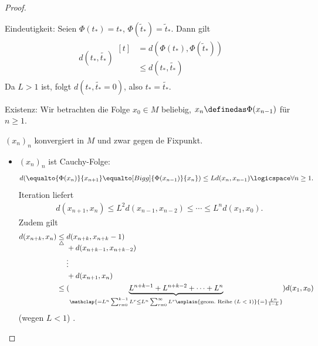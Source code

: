 \begin{proof}
    \begin{proofdescription}
        \item[Eindeutigkeit:] Seien \( \Phi(t_*)=t_*\), \( \Phi(\tilde{t}_*)=\tilde{t}_* \). Dann gilt
        \begin{align*}
            d(t_*,\tilde{t_*} )\begin{aligned}[t]
                &=d(\Phi(t_*),\Phi(\tilde{t}_*))\\
                &\leq d(t_*,\tilde{t_*} )
            \end{aligned}
        \end{align*} 
        Da \( L>1\) ist, folgt \( d(t_*,\tilde{t_*}=0 )\), also \( t_*=\tilde{t_*} \).
        \item[Existenz:] Wir betrachten die Folge \( x_0\in M\) beliebig, \( x_n\definedas \Phi(x_{n-1})\) für \( n\geq 1\).
        \begin{behauptung*}
            \( (x_n)_n\) konvergiert in \( M\)  und zwar gegen de Fixpunkt.
        \end{behauptung*}
        \begin{subproof}
            \begin{itemize}
                \item \( (x_n)_n\) ist Cauchy-Folge:
                \begin{align*}
                    d(\equalto{\Phi(x_n)}{x_{n+1}}\equalto[Bigg]{\Phi(x_{n-1})}{x_n})\leq L d(x_n,x_{n-1})\logicspace \forall n\geq 1.
                \end{align*}
                Iteration liefert
                \begin{align*}
                    d(x_{n+1},x_n)\leq L^2 d(x_{n-1},x_{n-2})\leq \cdots \leq L^n d(x_1,x_0).
                \end{align*}
                Zudem gilt
                \begin{align*}
                    d(x_{n+k},x_n)\begin{aligned}[t]
                        &\underset{\triangle}{\leq}\begin{aligned}[t]
                            &d(x_{n+k},x_{n+k}-1)\\
                            &+d(x_{n+k-1},x_{n+k-2})\\
                            &\vdots\\
                            &+d(x_{n+1},x_n)
                        \end{aligned}\\
                        &\leq (\underbrace{L^{n+k-1}+L^{n+k-2}+\cdots+L^n}_{\mathclap{=L^n \sum_{r=0}^{k-1} L^r\leq L^n \sum_{r=0}^{\infty} L^r\explain{\text{geom.\ Reihe (\( L<1\))}}{=}\frac{L^n}{1-L}}})d(x_1,x_0)
                    \end{aligned}
                \end{align*}
                \timplies (wegen \( L<1\)) \Beh.
                

\end{itemize}
\end{subproof}
\end{proofdescription}
\end{proof}
